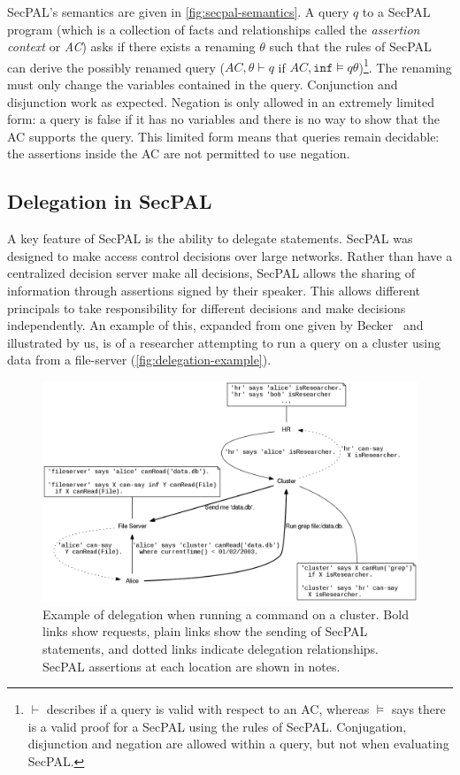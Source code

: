 \documentclass[thesis.tex]{subfiles}
\begin{document}
SecPAL's semantics are given in \autoref{fig:secpal-semantics}.  A
query $q$ to a SecPAL program (which is a collection of facts and
relationships called the \emph{assertion context} or \emph{AC}) asks
if there exists a renaming $\theta$ such that the rules of SecPAL can
derive the possibly renamed query ($AC,\theta \vdash q$
if $AC,\texttt{inf} \models q\theta$)\footnote{$\vdash$ describes if a query
  is valid with respect to an AC, whereas $\models$ says there is a
  valid proof for a SecPAL using the rules of SecPAL.  Conjugation,
  disjunction and negation are allowed within a query, but not when
  evaluating SecPAL.}.  The renaming must only change 
the variables contained in the query. Conjunction and disjunction work
as expected.  Negation is only allowed in an extremely limited form: a
query is false if it has no variables and there is no way
to show that the AC supports the query.  This limited form means that
queries remain decidable: the assertions inside the AC are not permitted to
use negation.

\subsection{Delegation in SecPAL}
\label{ssec:delegation_in_secpal}

A key feature of SecPAL is the ability to delegate statements. SecPAL was
designed to make access control decisions over large networks. Rather than have
a centralized decision server make all decisions, SecPAL allows
the sharing of information through assertions signed by their speaker. This allows
different principals to take responsibility for different decisions and make
decisions independently. An example of this, expanded from one given by
Becker~\cite{becker_secpal:_2006} and illustrated by us, is of a
researcher attempting to run a query on a cluster using data from a file-server
(\autoref{fig:delegation-example}).

\begin{figure}
  \centering
  \includegraphics[width=\textwidth]{figures/secpal-example.png}
  \caption[Example of delegation on a cluster.]{Example of delegation when running a command on a cluster.  Bold links show requests, plain links show the sending of SecPAL statements, and dotted links indicate delegation relationships.  SecPAL assertions at each location are shown in notes.}
  \label{fig:delegation-example}
\end{figure}
\end{document}
